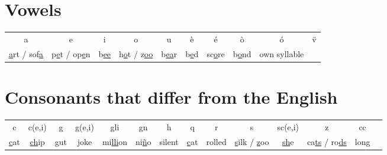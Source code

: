 \section*{Vowels}

\begin{tabular}{ccccccccc}
 a & e & i & o & u & \`{e} & \'{e} & \`{o} & \'{o} & \"{v} \\
\underline{a}rt / sof\underline{a} & p\underline{e}t / op\underline{e}n & b\underline{ee} & h\underline{o}t / z\underline{oo} & b\underline{ea}r & b\underline{e}d & sc\underline{o}re & b\underline{o}nd & own syllable \\
\end{tabular}

\section*{Consonants that differ from the English}

\begin{tabular}{cccccccccccccc}
 c & c(e,i) & g & g(e,i) & gli & gn & h & q & r & s & sc(e,i) & z & cc \\
\underline{c}at & \underline{ch}ip & \underline{g}ut & \underline{j}oke & mi\underline{lli}on & ni\underline{\~{n}}o & silent & \underline{c}at & rolled & \underline{s}ilk / \underline{z}oo & \underline{sh}e & ca\underline{ts} / ro\underline{ds} & long \\
\end{tabular}

